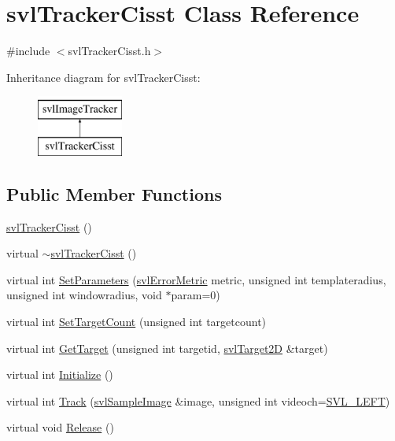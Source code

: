 \hypertarget{classsvl_tracker_cisst}{\section{svl\-Tracker\-Cisst Class Reference}
\label{classsvl_tracker_cisst}
}


{\ttfamily \#include $<$svl\-Tracker\-Cisst.\-h$>$}

Inheritance diagram for svl\-Tracker\-Cisst\-:\begin{figure}[H]
\begin{center}
\leavevmode
\includegraphics[height=2.000000cm]{d3/dee/classsvl_tracker_cisst}
\end{center}
\end{figure}
\subsection*{Public Member Functions}
\begin{DoxyCompactItemize}
\item 
\hyperlink{classsvl_tracker_cisst_ac28b4b10868b2958341d5ff76ce4faed}{svl\-Tracker\-Cisst} ()
\item 
virtual \hyperlink{classsvl_tracker_cisst_a3e03032a2c7f67bba38f9ae2bdb8a55a}{$\sim$svl\-Tracker\-Cisst} ()
\item 
virtual int \hyperlink{classsvl_tracker_cisst_a9834ebab345e4e85802800b7da13857e}{Set\-Parameters} (\hyperlink{svl_definitions_8h_ade0b97ec3319ac710d7478dd2b608727}{svl\-Error\-Metric} metric, unsigned int templateradius, unsigned int windowradius, void $\ast$param=0)
\item 
virtual int \hyperlink{classsvl_tracker_cisst_aa9ece9d86e6288e2878cc4d9a5aa2ecc}{Set\-Target\-Count} (unsigned int targetcount)
\item 
virtual int \hyperlink{classsvl_tracker_cisst_ac705a780f73a3493f8b294757365fe94}{Get\-Target} (unsigned int targetid, \hyperlink{structsvl_target2_d}{svl\-Target2\-D} \&target)
\item 
virtual int \hyperlink{classsvl_tracker_cisst_a2c5e0e63fb75a4b05a1b0114d3871703}{Initialize} ()
\item 
virtual int \hyperlink{classsvl_tracker_cisst_a45b609e4a8b49d3d3dcfee9520af4997}{Track} (\hyperlink{classsvl_sample_image}{svl\-Sample\-Image} \&image, unsigned int videoch=\hyperlink{svl_definitions_8h_ab9fec7615f19c8df2919eebcab0b187f}{S\-V\-L\-\_\-\-L\-E\-F\-T})
\item 
virtual void \hyperlink{classsvl_tracker_cisst_ac7c0f1b27c219e01880016fe8a547d74}{Release} ()
\end{DoxyCompactItemize}
